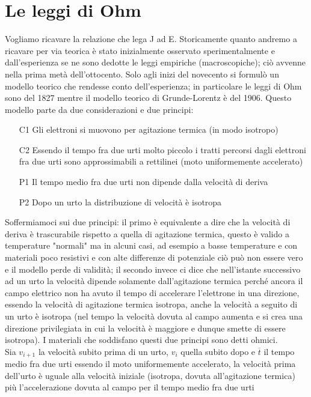 \documentclass[10pt,a4paper]{article}
\begin{document}
\section{Le leggi di Ohm}
Vogliamo ricavare la relazione che lega J ad E. Storicamente quanto andremo a ricavare per via teorica è stato inizialmente osservato sperimentalmente e dall'esperienza se ne sono dedotte le leggi empiriche (macroscopiche); ciò avvenne nella prima metà dell'ottocento. Solo agli inizi del novecento si formulò un modello teorico che rendesse conto dell'esperienza; in particolare le leggi di Ohm sono del 1827 mentre il modello teorico di Grunde-Lorentz è del 1906. Questo modello parte da due considerazioni e due principi:
\begin{itemize}
	\item[C1] Gli elettroni si muovono per agitazione termica (in modo isotropo)
	\item[C2] Essendo il tempo fra due urti molto piccolo i tratti percorsi dagli elettroni fra due urti sono approssimabili a rettilinei (moto uniformemente accelerato)
	\item[P1] Il tempo medio fra due urti non dipende dalla velocità di deriva
	\item[P2] Dopo un urto la distribuzione di velocità è isotropa
\end{itemize}
Soffermiamoci sui due principi: il primo è equivalente a dire che la velocità di deriva è trascurabile rispetto a quella di agitazione termica, questo è valido a temperature "normali" ma in alcuni casi, ad esempio a basse temperature e con materiali poco resistivi e con alte differenze di potenziale ciò può non essere vero e il modello perde di validità; il secondo invece ci dice che nell'istante successivo ad un urto la velocità dipende solamente dall'agitazione termica perché ancora il campo elettrico non ha avuto il tempo di accelerare l'elettrone in una direzione, essendo la velocità di agitazione termica isotropa, anche la velocità a seguito di un urto è isotropa (nel tempo la velocità dovuta al campo aumenta e si crea una direzione privilegiata in cui la velocità è maggiore e dunque smette di essere isotropa). I materiali che soddisfano questi due principi sono detti ohmici.\\
Sia \(v_{i+1}\) la velocità subito prima di un urto, \(v_i\) quella subito dopo e $\overline{t}$ il tempo medio fra due urti essendo il moto uniformemente accelerato, la velocità prima dell'urto è uguale alla velocità iniziale (isotropa, dovuta all'agitazione termica) più l'accelerazione dovuta al campo per il tempo medio fra due urti
\end{document}
